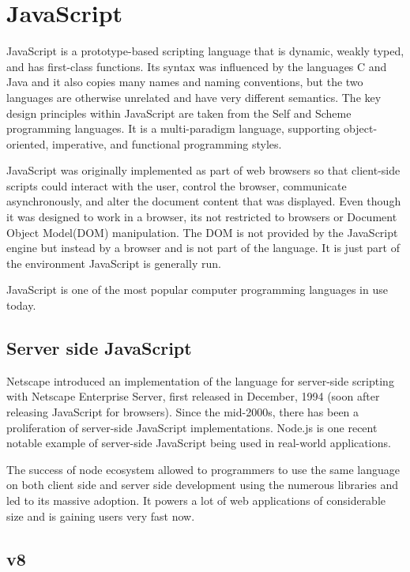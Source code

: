 \section{JavaScript}

JavaScript is a prototype-based scripting language that is dynamic, weakly
typed, and has first-class functions. Its syntax was influenced by the languages
C and Java and it also copies many names and naming conventions, but the two
languages are otherwise unrelated and have very different semantics. The key
design principles within JavaScript are taken from the Self and Scheme
programming languages. It is a multi-paradigm language, supporting
object-oriented, imperative, and functional programming styles.

JavaScript was originally implemented as part of web browsers so that
client-side scripts could interact with the user, control the browser,
communicate asynchronously, and alter the document content that was displayed.
Even though it was designed to work in a browser, its not restricted to browsers
or Document Object Model(DOM) manipulation. The DOM is not provided by the
JavaScript engine but instead by a browser and is not part of the language. It
is just part of the environment JavaScript is generally run.

JavaScript is one of the most popular computer programming languages in use
today.

\subsection{Server side JavaScript}

Netscape introduced an implementation of the language for server-side scripting
with Netscape Enterprise Server, first released in December, 1994 (soon after
releasing JavaScript for browsers). Since the mid-2000s, there has been a
proliferation of server-side JavaScript implementations. Node.js is one recent
notable example of server-side JavaScript being used in real-world applications.

The success of node ecosystem allowed to programmers to use the same language on
both client side and server side development using the numerous libraries and
led to its massive adoption. It powers a lot of web applications of considerable
size and is gaining users very fast now.

\subsection{v8}


